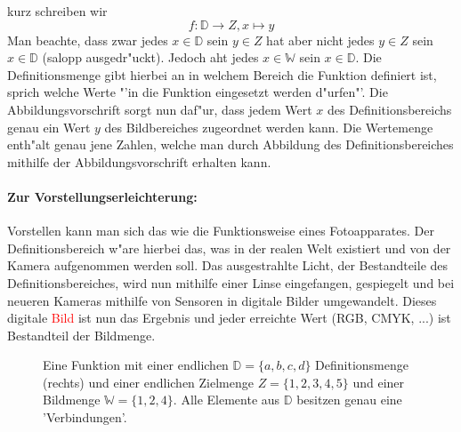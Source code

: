 \begin{flushleft}
kurz schreiben wir
\begin{equation*}
f : \mathbb{D} \to Z, x \mapsto y
\end{equation*}
Man beachte, dass zwar jedes $x \in \mathbb{D}$ sein $y \in Z$ hat aber nicht jedes $y \in Z$ sein $x \in \mathbb{D}$ (salopp ausgedr"uckt). Jedoch aht jedes $x \in \mathbb{W}$ sein $x \in \mathbb{D}$. Die Definitionsmenge gibt hierbei an in welchem Bereich die Funktion definiert ist, sprich welche Werte "'in die Funktion eingesetzt werden d"urfen"'. Die Abbildungsvorschrift sorgt nun daf"ur, dass jedem Wert $x$ des Definitionsbereichs genau ein Wert $y$ des Bildbereiches zugeordnet werden kann. Die Wertemenge enth"alt genau jene Zahlen, welche man durch Abbildung des Definitionsbereiches mithilfe der Abbildungsvorschrift erhalten kann.

\paragraph{Zur Vorstellungserleichterung:}
Vorstellen kann man sich das wie die Funktionsweise eines Fotoapparates. Der Definitionsbereich w"are hierbei das, was in der realen Welt existiert und von der Kamera aufgenommen werden soll. Das ausgestrahlte Licht, der Bestandteile des Definitionsbereiches, wird nun mithilfe einer Linse eingefangen, gespiegelt und bei neueren Kameras mithilfe von Sensoren in digitale Bilder umgewandelt. Dieses digitale \textcolor{red}{Bild} ist nun das Ergebnis und jeder erreichte Wert (RGB, CMYK, ...) ist Bestandteil der Bildmenge.
\begin{figure}[h!]
 \centering
 \caption{Eine Funktion mit einer endlichen $\mathbb{D} = \{a, b, c, d\}$ Definitionsmenge (rechts) und einer endlichen Zielmenge $Z = \{1, 2, 3, 4, 5\}$ und einer Bildmenge $\mathbb{W} = \{1,2,4\}$. Alle Elemente aus $\mathbb{D}$ besitzen genau eine 'Verbindungen'.}
\end{figure}


\end{flushleft}
